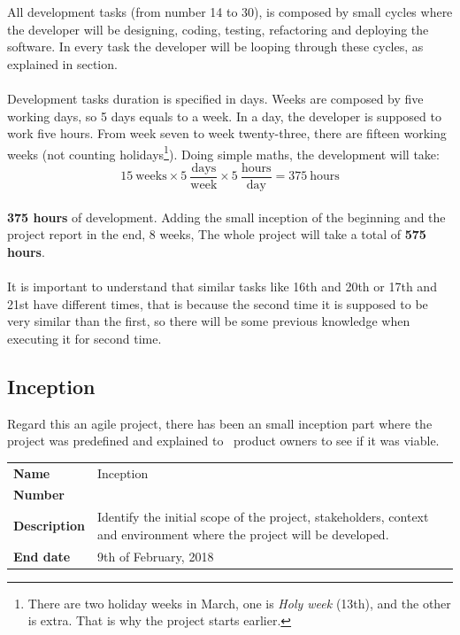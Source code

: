 All development tasks (from number 14 to 30), is composed by small cycles where the developer will be designing, coding, testing, refactoring and deploying the software. In every task the developer will be looping through these cycles, as explained in  section.
\\\\
Development tasks duration is specified in days. Weeks are composed by five working days, so 5 days equals to a week. In a day, the developer is supposed to work five hours. From week seven to week twenty-three, there are fifteen working weeks (not counting holidays\footnote{There are two holiday weeks in March, one is \textit{Holy week} (13th), and the other is extra. That is why the project starts earlier.}). Doing simple maths, the development will take:
\\
$$15\ \textrm{weeks} \times 5\ \frac{\textrm{days}}{\textrm{week}} \times 5\ \frac{\textrm{hours}}{\textrm{day}} = 375\ \textrm{hours}$$
\\
\textbf{375 hours} of development. Adding the small inception of the beginning and the project report in the end, 8 weeks, The whole project will take a total of \textbf{575 hours}.
\\\\
It is important to understand that similar tasks like 16th and 20th or 17th and 21st have different times, that is because the second time it is supposed to be very similar than the first, so there will be some previous knowledge when executing it for second time.


\subsection{Inception}

Regard this an agile project, there has been an small inception part where the project was predefined and explained to \company\ product owners to see if it was viable.

\begin{table}[H]
\begin{tabular}{>{\raggedleft\arraybackslash}p{3cm}>{\raggedright\arraybackslash}p{11cm}}
\textbf{Name}        & Inception \\
\textbf{Number}      & 1 \\
\textbf{Description} & Identify the initial scope of the project, stakeholders, context and environment where the project will be developed. \\
\textbf{End date}    & 9th of February, 2018 \\
\end{tabular}
\label{milestone1}
\end{table}

